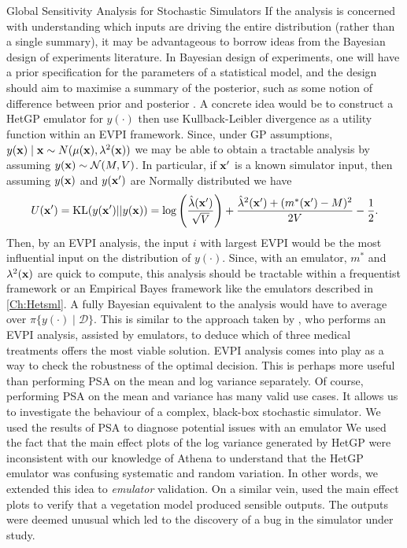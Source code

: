 \begin{chapter}{Global Sensitivity Analysis for Stochastic Simulators\label{Ch:sensitivity}}
If the analysis is concerned with understanding which inputs are driving the entire distribution (rather than a single summary), it may be advantageous to borrow ideas from the Bayesian design of experiments literature. In Bayesian design of experiments, one will have a prior specification for the parameters of a statistical model, and the design should aim to maximise a summary of the posterior, such as some notion of difference between prior and posterior \citep{Prangle2022}. A concrete idea would be to construct a HetGP emulator for $y(\cdot)$ then use Kullback-Leibler divergence as a utility function within an EVPI framework. Since, under GP assumptions, $y(\mathbf{x})\mid\mathbf{x} \sim N(\mu(\mathbf{x}),\lambda^2(\mathbf{x}))$ we may be able to obtain a tractable analysis by assuming $y(\mathbf{x}) \sim \mathcal{N}(M, V)$. In particular, if $\mathbf{x}'$ is a known simulator input, then assuming $y(\mathbf{x})$ and $y(\mathbf{x}')$ are Normally distributed we have
\begin{equation}
  U(\mathbf{x}') = \text{KL}(y(\mathbf{x}') || y(\mathbf{x})) = \log \left( \frac{\hat{\lambda}(\mathbf{x}')}{\sqrt{V}} \right) + \frac{\hat{\lambda}^2(\mathbf{x}') + (m^{*}(\mathbf{x}') - M)^2}{2V} - \frac{1}{2}.
\end{equation}
Then, by an EVPI analysis, the input $i$ with largest EVPI would be the most influential input on the distribution of $y(\cdot)$. Since, with an emulator, $m^{*}$ and $\lambda^2(\mathbf{x})$ are quick to compute, this analysis should be tractable within a frequentist framework or an Empirical Bayes framework like the emulators described in \cref{Ch:Hetsml}. A fully Bayesian equivalent to the analysis would have to average over $\pi \{ y(\cdot) \mid \mathcal{D} \}$. This is similar to the approach taken by \citet{Oakley2009}, who performs an EVPI analysis, assisted by emulators, to deduce which of three medical treatments offers the most viable solution. EVPI analysis comes into play as a way to check the robustness of the optimal decision. This is perhaps more useful than performing PSA on the mean and log variance separately. Of course, performing PSA on the mean and variance has many valid use cases. It allows us to investigate the behaviour of a complex, black-box stochastic simulator. We used the results of PSA to diagnose potential issues with an emulator We used the fact that the main effect plots of the log variance generated by HetGP were inconsistent with our knowledge of Athena to understand that the HetGP emulator was confusing systematic and random variation. In other words, we extended this idea to \textit{emulator} validation. On a similar vein, \citet{Kennedy2006} used the main effect plots to verify that a vegetation model produced sensible outputs. The outputs were deemed unusual which led to the discovery of a bug in the simulator under study.
\end{chapter}

